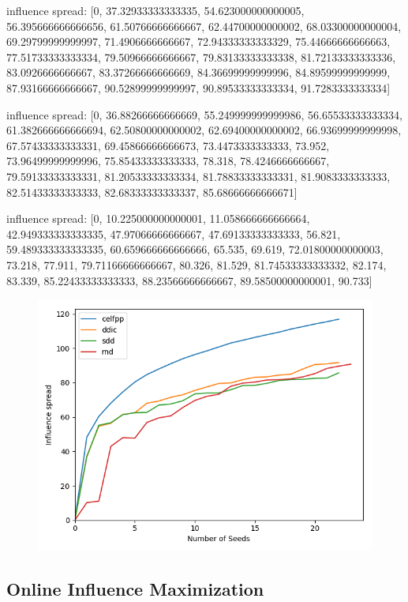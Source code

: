 influence spread: [0, 37.32933333333335, 54.623000000000005, 56.395666666666656, 61.50766666666667, 62.44700000000002, 68.03300000000004, 69.29799999999997, 71.4906666666667, 72.94333333333329, 75.44666666666663, 77.51733333333334, 79.50966666666667, 79.83133333333338, 81.72133333333336, 83.0926666666667, 83.37266666666669, 84.36699999999996, 84.89599999999999, 87.93166666666667, 90.52899999999997, 90.89533333333334, 91.7283333333334]

influence spread: [0, 36.88266666666669, 55.249999999999986, 56.65533333333334, 61.382666666666694, 62.50800000000002, 62.69400000000002, 66.93699999999998, 67.57433333333331, 69.45866666666673, 73.4473333333333, 73.952, 73.96499999999996, 75.85433333333333, 78.318, 78.4246666666667, 79.59133333333331, 81.20533333333334, 81.78833333333331, 81.9083333333333, 82.51433333333333, 82.68333333333337, 85.68666666666671]

influence spread: [0, 10.225000000000001, 11.058666666666664, 42.949333333333335, 47.97066666666667, 47.69133333333333, 56.821, 59.489333333333335, 60.659666666666666, 65.535, 69.619, 72.01800000000003, 73.218, 77.911, 79.71166666666667, 80.326, 81.529, 81.74533333333332, 82.174, 83.339, 85.22433333333333, 88.23566666666667, 89.58500000000001, 90.733]



\begin{figure}[H]
	\centering
	\includegraphics[scale=0.6]{img/IMG8}
\end{figure}



\subsection{Online Influence Maximization}



